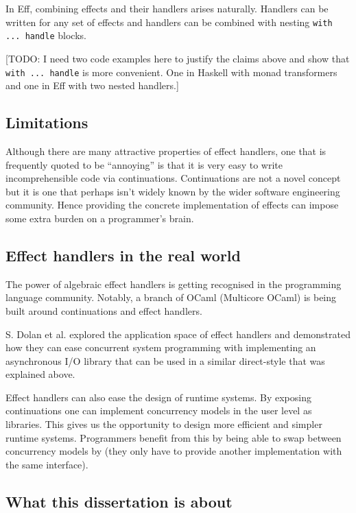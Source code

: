 \documentclass[class=article,crop=false,11pt]{standalone}
\begin{document}
In Eff, combining effects and their handlers arises naturally. Handlers can be written for any set of effects and handlers can be combined 
with nesting \verb|with ... handle| blocks.

[TODO: I need two code examples here to justify the claims above and show that \verb|with ... handle| is more convenient. One in Haskell with monad transformers and one in Eff with two nested handlers.]

\subsection{Limitations}

Although there are many attractive properties of effect handlers, one that is frequently quoted to be ``annoying'' is that it is very easy to write incomprehensible code via continuations.
Continuations are not a novel concept but it is one that perhaps isn't widely known by the wider software engineering community. Hence providing the concrete implementation of effects
can impose some extra burden on a programmer's brain.


\subsection{Effect handlers in the real world}

The power of algebraic effect handlers is getting recognised in the programming language community. 
Notably, a branch of OCaml (Multicore OCaml) is being built around
continuations and effect handlers.

S. Dolan et al. \cite{dolan2017concurrent} explored the application space of effect handlers and 
demonstrated how they can ease concurrent system programming with implementing an asynchronous I/O 
library that can be used in a similar direct-style that was explained above.

Effect handlers can also ease the design of runtime systems. By exposing continuations one
can implement concurrency models in the user level as libraries. This gives us the opportunity
to design more efficient and simpler runtime systems. Programmers benefit from this by
being able to swap between concurrency models by (they only have to provide another implementation with the same interface).

\subsection{What this dissertation is about}
\end{document}
